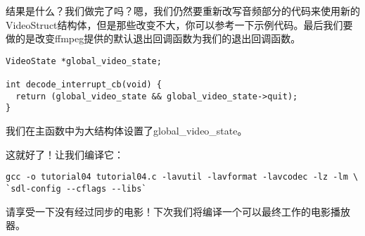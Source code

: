 结果是什么？我们做完了吗？嗯，我们仍然要重新改写音频部分的代码来使用新的VideoStruct结构体，但是那些改变不大，你可以参考一下示例代码。最后我们要做的是改变ffmpeg提供的默认退出回调函数为我们的退出回调函数。

\begin{lstlisting}
VideoState *global_video_state;

int decode_interrupt_cb(void) {
  return (global_video_state && global_video_state->quit);
}
\end{lstlisting}

我们在主函数中为大结构体设置了global_video_state。

这就好了！让我们编译它：
\begin{lstlisting}
gcc -o tutorial04 tutorial04.c -lavutil -lavformat -lavcodec -lz -lm \
`sdl-config --cflags --libs`
\end{lstlisting}

请享受一下没有经过同步的电影！下次我们将编译一个可以最终工作的电影播放器。
